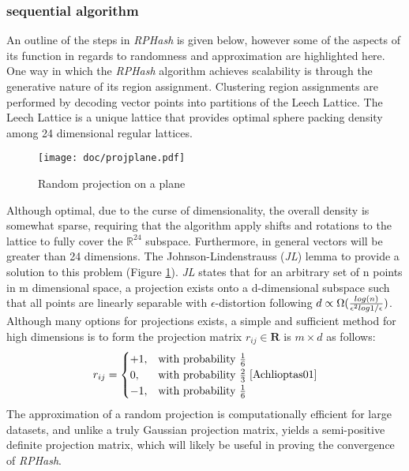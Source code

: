 \documentclass[a4paper,10pt]{article}
\begin{document}
\subsubsection{sequential algorithm}

An outline of the steps in \emph{RPHash} is given below, however some of
the aspects of its function in regards to randomness and approximation are
highlighted here.  One way in which the \emph{RPHash} algorithm achieves
scalability is through the generative nature of its region assignment.
Clustering region assignments are performed by decoding vector points
into partitions of the Leech Lattice.  The Leech Lattice is a unique
lattice that provides optimal sphere packing density among 24 dimensional
regular lattices\cite{Cohn}.  
\begin{figure}%
\centering
\texttt{[image: doc/projplane.pdf]}
\caption{Random projection on a plane\label{projplane}}
\end{figure}
Although optimal, due to the curse of
dimensionality, the overall density is somewhat sparse, requiring that the
algorithm apply shifts and rotations to the lattice to fully cover the
$\mathbb{R}^{24}$ subspace.  Furthermore, in general vectors will be greater 
than 24 dimensions.  The Johnson-Lindenstrauss (\emph{JL}) lemma to provide a
solution to
this problem (Figure \ref{projplane}).  \emph{JL} states that for an arbitrary
set of n
points in m dimensional space, a projection exists onto a d-dimensional 
subspace such that all points are linearly separable with $\epsilon$-distortion
 following 
 $d \propto {\Omega({{ log(n) }\over {\epsilon^2 log 1/\epsilon}  })}$.
 Although many options for projections exists, a simple and sufficient 
method for high dimensions is to form the projection matrix 
$r_{ij}\in\textbf{R}$ is $m\times d$ as follows:
\[
    r_{ij}= 
\begin{cases}
    +1, & \text{with probability } {1 \over 6}\\
     0, & \text{with probability } {2 \over 3}\\
    -1, & \text{with probability } {1 \over 6}\\
\end{cases}\text{\cite{Achlioptas01}}
\]
The approximation of a random projection is computationally
efficient for large datasets, and unlike a truly Gaussian projection matrix,
yields a semi-positive definite projection matrix, which will likely be
useful in proving the convergence of \emph{RPHash}.
\end{document}
